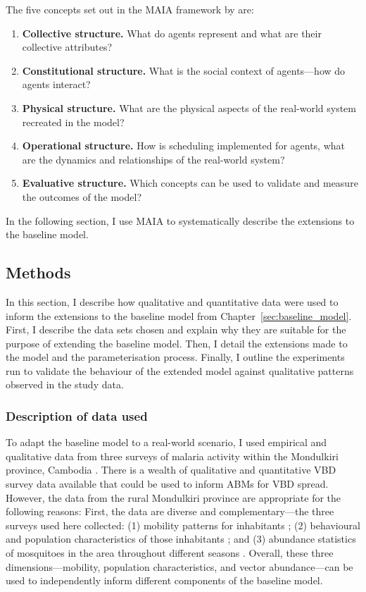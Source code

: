The five concepts set out in the MAIA framework by \citet{ghorbani_maia_2013} are:

\begin{enumerate}[label=\textbf{\arabic*}.]
    \item \textbf{Collective structure.} What do agents represent and what are their collective attributes?
    \item \textbf{Constitutional structure.} What is the social context of agents---how do agents interact?
    \item \textbf{Physical structure.} What are the physical aspects of the real-world system recreated in the model?
    \item \textbf{Operational structure.} How is scheduling implemented for agents, what are the dynamics and relationships of the real-world system?
    \item \textbf{Evaluative structure.} Which concepts can be used to validate and measure the outcomes of the model?
\end{enumerate}

In the following section, I use MAIA to systematically describe the extensions to the baseline model.

\subsection{Methods}

In this section, I describe how qualitative and quantitative data were used to inform the extensions to the baseline model from Chapter~\ref{sec:baseline_model}. First, I describe the data sets chosen and explain why they are suitable for the purpose of extending the baseline model. Then, I detail the extensions made to the model and the parameterisation process. Finally, I outline the experiments run to validate the behaviour of the extended model against qualitative patterns observed in the study data.

\subsubsection{Description of data used}

To adapt the baseline model to a real-world scenario, I used empirical and qualitative data from three surveys of malaria activity within the Mondulkiri province, Cambodia \cite{pepey_mobility_2022, sandfort_forest_2020, vantaux_anopheles_2021}. There is a wealth of qualitative and quantitative VBD survey data available that could be used to inform ABMs for VBD spread. However, the data from the rural Mondulkiri province are appropriate for the following reasons: First, the data are diverse and complementary---the three surveys used here collected: (1) mobility patterns for inhabitants \cite{pepey_mobility_2022}; (2) behavioural and population characteristics of those inhabitants \cite{sandfort_forest_2020}; and (3) abundance statistics of mosquitoes in the area throughout different seasons \cite{vantaux_anopheles_2021}. Overall, these three dimensions---mobility, population characteristics, and vector abundance---can be used to independently inform different components of the baseline model.

